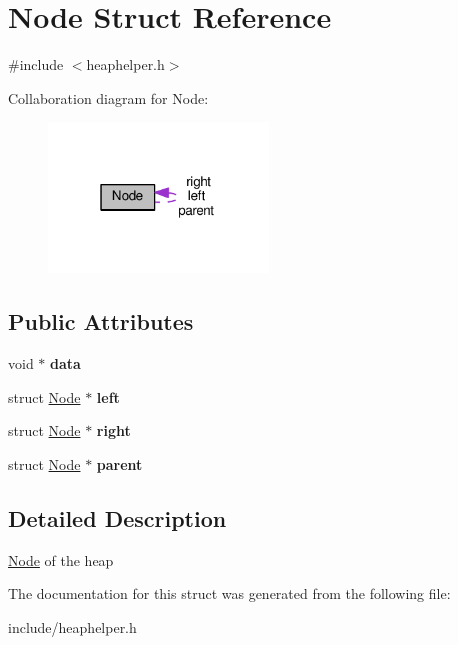\hypertarget{structNode}{}\section{Node Struct Reference}
\label{structNode}


{\ttfamily \#include $<$heaphelper.\+h$>$}



Collaboration diagram for Node\+:\nopagebreak
\begin{figure}[H]
\begin{center}
\leavevmode
\includegraphics[width=166pt]{structNode__coll__graph}
\end{center}
\end{figure}
\subsection*{Public Attributes}
\begin{DoxyCompactItemize}
\item 
\mbox{\label{structNode_a38b733496e3eff5e0b4fcb11cd9b866a}} 
void $\ast$ {\bfseries data}
\item 
\mbox{\label{structNode_ad0976834843c7618677d22a10c495b36}} 
struct \hyperlink{structNode}{Node} $\ast$ {\bfseries left}
\item 
\mbox{\label{structNode_af99e7102380da88d7c079fa264230cf4}} 
struct \hyperlink{structNode}{Node} $\ast$ {\bfseries right}
\item 
\mbox{\label{structNode_a34f3ab9670c7b70dad8905359a243c92}} 
struct \hyperlink{structNode}{Node} $\ast$ {\bfseries parent}
\end{DoxyCompactItemize}


\subsection{Detailed Description}
\hyperlink{structNode}{Node} of the heap 

The documentation for this struct was generated from the following file\+:\begin{DoxyCompactItemize}
\item 
include/heaphelper.\+h\end{DoxyCompactItemize}
